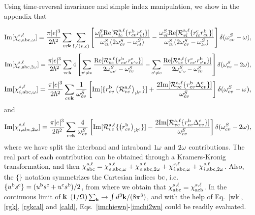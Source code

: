 \documentclass{article}
\begin{document}
Using time-reversal invariance and simple index manipulation, we show
in the appendix that

\begin{equation}\label{imchiewn}
\mathrm{Im}[\chi_{e,\mathrm{a}\mathrm{b}\mathrm{c},\omega}^{s,\ell}]
=
\frac{\pi |e|^3}{2\hbar^2} 
\sum_{vc\mathbf{k}}
\sum_{l\neq(v,c)}
\left[
\frac{\omega^S_{lc}\mathrm{Re}[{\cal R}^{\mathrm{a},\ell}_{lc}\{r^{\mathrm{b}}_{cv}r^{\mathrm{c}}_{vl}\}]}
{\omega^S_{cv}(2\omega^S_{cv}-\omega^S_{cl})}
-
\frac{\omega^S_{vl}\mathrm{Re}[{\cal R}^{\mathrm{a},\ell}_{vl}\{r^{\mathrm{c}}_{lc}r^{\mathrm{b}}_{cv}\}]}
{\omega^S_{cv}(2\omega^S_{cv}-\omega^S_{lv})}
\right]
\delta(\omega^S_{cv}-\omega)
,
\end{equation}  
\begin{equation}\label{imchie2wn}
\mathrm{Im}[\chi_{e,\mathrm{a}\mathrm{b}\mathrm{c},2\omega}^{s,\ell}]
=
\frac{\pi |e|^3}{2\hbar^2} 
\sum_{vc\mathbf{k}}
4
\left[
\sum_{v'\ne v}
\frac{\mathrm{Re}[{\cal
    R}^{\mathrm{a},\ell}_{vc}\{r^{\mathrm{b}}_{cv'}r^{\mathrm{c}}_{v'v}\}]}{2\omega^S_{cv'}-\omega^S_{cv}}
-
\sum_{c'\ne c}
\frac{\mathrm{Re}[{\cal R}^{\mathrm{a},\ell}_{vc}\{r^{\mathrm{c}}_{cc'}r^{\mathrm{b}}_{c'v}\}]}
{2\omega^S_{c'v}-\omega^S_{cv}}
\right]
\delta(\omega^S_{cv}-2\omega)
,
\end{equation}
\begin{equation}\label{imchiwn}
\mathrm{Im}[\chi_{i,\mathrm{a}\mathrm{b}\mathrm{c},\omega}^{s,\ell}]
=
\frac{\pi|e|^3}{2\hbar^2}
\sum_{cv\mathbf{k}}
\frac{1}{\omega^S_{cv}}
\left[
\mathrm{Im}[\{r^{\mathrm{b}}_{cv}\left({\cal R}^{\mathrm{a},\ell}_{vc}\right)_{;k^{\mathrm{c}}}\}]
+
\frac{2\mathrm{Im}[{\cal R}^{\mathrm{a},\ell}_{vc}\{r^{\mathrm{b}}_{cv}\Delta^{\mathrm{c}}_{cv}\}]}{\omega^S_{cv}}
\right]
\delta(\omega^S_{cv}-\omega)
,
\end{equation}
and
\begin{equation}\label{imchi2wn}
\mathrm{Im}[\chi_{i,\mathrm{a}\mathrm{b}\mathrm{c},2\omega}^{s,\ell}]
=
\frac{\pi|e|^3}{2\hbar^2}\sum_{vc\mathbf{k}}
\frac{4}{\omega^S_{cv}}
\left[
\mathrm{Im}[{\cal R}^{\mathrm{a},\ell}_{vc}\{\left(r^{\mathrm{b}}_{cv}\right)_{;k^{\mathrm{c}}}\}]
-
\frac{2\mathrm{Im}[{\cal R}^{\mathrm{a},\ell}_{vc}\{r^{\mathrm{b}}_{cv}\Delta^{\mathrm{c}}_{cv}\}]}{\omega^S_{cv}}
\right]\delta(\omega^S_{cv}-2\omega)
,
\end{equation}
where we have split the interband and intraband $1\omega$ and $2\omega$
contributions. The real part of each contribution can be obtained through
a Kramers-Kronig transformation, and then
$\chi^{s,\ell}_{\mathrm{a}\mathrm{b}\mathrm{c}}=\chi^{s,\ell}_{e,\mathrm{a}\mathrm{b}\mathrm{c},\omega}+\chi^{s,\ell}_{e,\mathrm{a}\mathrm{b}\mathrm{c},2\omega}+\chi^{s,\ell}_{i,\mathrm{a}\mathrm{b}\mathrm{c},\omega}+\chi^{s,\ell}_{i,\mathrm{a}\mathrm{b}\mathrm{c},2\omega}
$. Also,
the
$\{\}$ notation symmetrizes the Cartesian indices $\mathrm{b}\mathrm{c}$, i.e. 
$\{u^{\mathrm{b}}s^{\mathrm{c}}\}=(u^{\mathrm{b}}s^{\mathrm{c}}+u^{\mathrm{c}}s^{\mathrm{b}})/2$,
from where we obtain that
$\chi_{\mathrm{a}\mathrm{b}\mathrm{c}}^{s,\ell}=\chi_{\mathrm{a}\mathrm{c}\mathrm{b}}^{s,\ell}$.
In the continuous limit of $\mathbf{k}$ 
$(1/\Omega)\sum_{\mathbf{k}}\to\int d^3\mathbf{k}/(8\pi^3)$, and with the help of 
Eq.~\eqref{wk}, \eqref{rgk}, \eqref{rgkcal} and \eqref{cald}, 
Eqs.~\eqref{imchiewn}-\eqref{imchi2wn} could be
readily evaluated.
\end{document}
